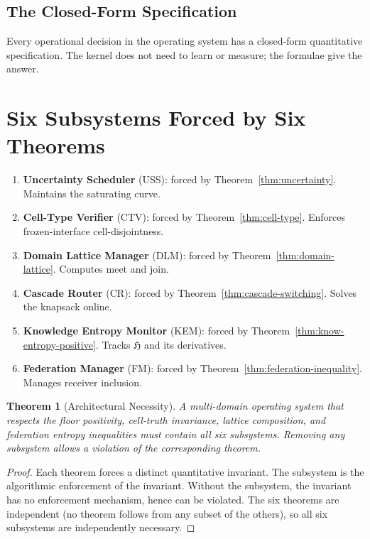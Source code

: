 \documentclass[11pt,a4paper]{article}
\newtheorem{theorem}{Theorem}[section]
\newcommand{\Hknow}{\mathfrak{H}}
\begin{document}
\subsection{The Closed-Form Specification}

Every operational decision in the operating system has a closed-form quantitative specification. The kernel does not need to learn or measure; the formulae give the answer.

\section{Six Subsystems Forced by Six Theorems}
\label{sec:subsystem-mapping}

\begin{enumerate}[nosep,leftmargin=*]
\item \textbf{Uncertainty Scheduler} (USS): forced by Theorem~\ref{thm:uncertainty}. Maintains the saturating curve.
\item \textbf{Cell-Type Verifier} (CTV): forced by Theorem~\ref{thm:cell-type}. Enforces frozen-interface cell-disjointness.
\item \textbf{Domain Lattice Manager} (DLM): forced by Theorem~\ref{thm:domain-lattice}. Computes meet and join.
\item \textbf{Cascade Router} (CR): forced by Theorem~\ref{thm:cascade-switching}. Solves the knapsack online.
\item \textbf{Knowledge Entropy Monitor} (KEM): forced by Theorem~\ref{thm:know-entropy-positive}. Tracks $\Hknow$ and its derivatives.
\item \textbf{Federation Manager} (FM): forced by Theorem~\ref{thm:federation-inequality}. Manages receiver inclusion.
\end{enumerate}

\begin{theorem}[Architectural Necessity]
\label{thm:arch-necessity}
A multi-domain operating system that respects the floor positivity, cell-truth invariance, lattice composition, and federation entropy inequalities must contain all six subsystems. Removing any subsystem allows a violation of the corresponding theorem.
\end{theorem}

\begin{proof}
Each theorem forces a distinct quantitative invariant. The subsystem is the algorithmic enforcement of the invariant. Without the subsystem, the invariant has no enforcement mechanism, hence can be violated. The six theorems are independent (no theorem follows from any subset of the others), so all six subsystems are independently necessary.
\end{proof}
\end{document}
